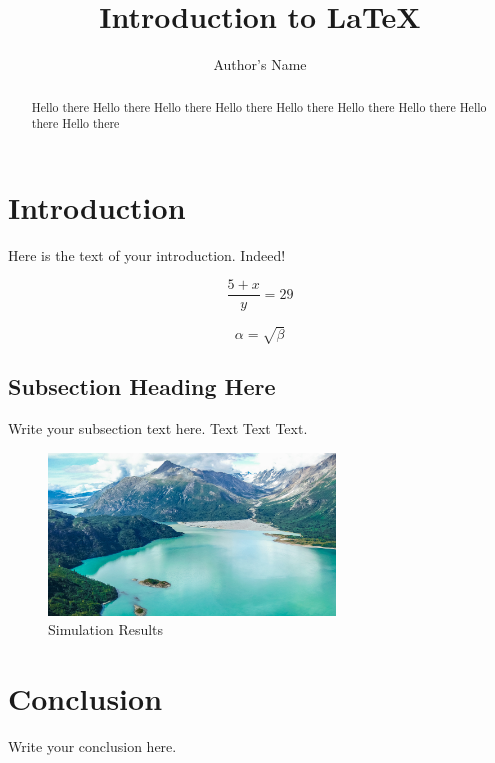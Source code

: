 \documentclass{article}
\begin{document}
\title{Introduction to \LaTeX{}}
\author{Author's Name}

\maketitle

\begin{abstract}
	Hello there
	Hello there
	Hello there
	Hello there
	Hello there
	Hello there
	Hello there
	Hello there
	Hello there
\end{abstract}

\section{Introduction}
Here is the text of your introduction. Indeed!

\begin{equation}
	\frac{5 + x}{y} = 29
\end{equation}

\begin{equation}
    \label{simple_equation}
    \alpha = \sqrt{ \beta }
\end{equation}

\subsection{Subsection Heading Here}
Write your subsection text here. Text Text Text.

\begin{figure}
    \centering
    \includegraphics[width=3.0in]{myfigure}
    \caption{Simulation Results}
    \label{simulationfigure}
\end{figure}

\section{Conclusion}
Write your conclusion here.
\end{document}

